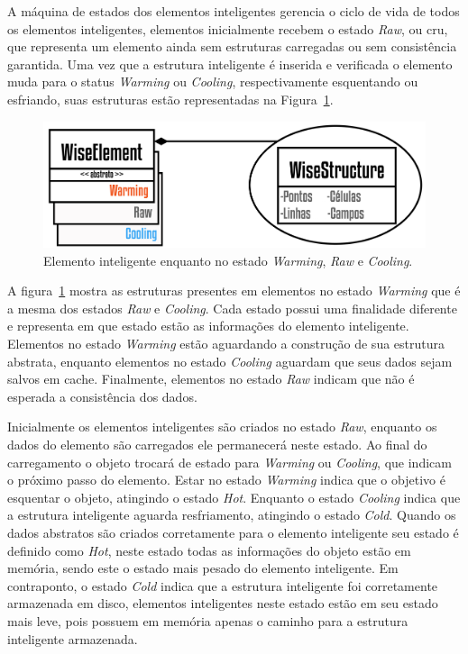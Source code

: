 A máquina de estados dos elementos inteligentes gerencia o ciclo de vida de todos os elementos inteligentes, elementos inicialmente recebem o estado \textit{Raw}, ou cru, que representa um elemento ainda sem estruturas carregadas ou sem consistência garantida. Uma vez que a estrutura inteligente é inserida e verificada o elemento muda para o status \textit{Warming} ou \textit{Cooling}, respectivamente esquentando ou esfriando, suas estruturas estão representadas na Figura~\ref{fig4:wiselementwarming}.

\begin{figure}[!htbp]
	\centering
	\includegraphics[scale=1.85]{Figures/WiseElementWarming@16x.png}
	\caption{Elemento inteligente enquanto no estado \textit{Warming}, \textit{Raw} e \textit{Cooling}.}
	\label{fig4:wiselementwarming}
\end{figure}

A figura~\ref{fig4:wiselementwarming} mostra as estruturas presentes em elementos no estado \textit{Warming} que é a mesma dos estados \textit{Raw} e \textit{Cooling}. Cada estado possui uma finalidade diferente e representa em que estado estão as informações do elemento inteligente. Elementos no estado \textit{Warming} estão aguardando a construção de sua estrutura abstrata, enquanto elementos  no estado \textit{Cooling} aguardam que seus dados sejam salvos em cache. Finalmente, elementos no estado \textit{Raw} indicam que não é esperada a consistência dos dados.

Inicialmente os elementos inteligentes são criados no estado \textit{Raw}, enquanto os dados do elemento são carregados ele permanecerá neste estado. Ao final do carregamento o objeto trocará de estado para \textit{Warming} ou \textit{Cooling}, que indicam o próximo passo do elemento. Estar no estado \textit{Warming} indica que o objetivo é esquentar o objeto, atingindo o estado \textit{Hot}. Enquanto o estado \textit{Cooling} indica que a estrutura inteligente aguarda resfriamento, atingindo o estado \textit{Cold}. Quando os dados abstratos são criados corretamente para o elemento inteligente seu estado é definido como \textit{Hot}, neste estado todas as informações do objeto estão em memória, sendo este o estado mais pesado do elemento inteligente. Em contraponto, o estado \textit{Cold} indica que a estrutura inteligente foi corretamente armazenada em disco, elementos inteligentes neste estado estão em seu estado mais leve, pois possuem em memória apenas o caminho para a estrutura inteligente armazenada.

